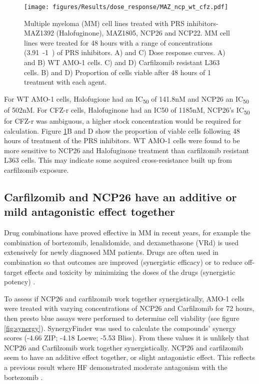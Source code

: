 \begin{figure}[h]
\centering
\texttt{[image: figures/Results/dose\_response/MAZ\_ncp\_wt\_cfz.pdf]}
\caption[PRS inhibitor dose response curves]{Multiple myeloma (MM) cell lines treated with PRS inhibitors- MAZ1392 (Halofuginone), MAZ1805, NCP26 and NCP22.
MM cell lines were treated for 48 hours with a range of concentrations (3.91\si{\nano\Molar}-1\si{\micro\Molar}) of PRS inhibitors.
A) and C) Dose response curves.
A) and B) WT AMO-1 cells.
C) and D) Carfilzomib resistant L363 cells.
B) and D) Proportion of cells viable after 48 hours of 1\si{\micro\Molar} treatment with each agent. }
\label{fig:dose}
\end{figure}

For WT AMO-1 cells, Halofugione had an IC\textsubscript{50} of 141.8nM and NCP26 an IC\textsubscript{50} of 502nM. For CFZ-r cells, Halofuginone had an IC50 of 1185nM, NCP26's IC\textsubscript{50} for CFZ-r was ambiguous, a higher stock concentration would be required for calculation.
Figure \ref{fig:dose}B and D show the proportion of viable cells following 48 hours of treatment of the PRS inhibitors.
WT AMO-1 cells were found to be more sensitive to NCP26 and Halofuginone treatment than carfilzomib resistant L363 cells.
This may indicate some acquired cross-resistance built up from carfilzomib exposure.

\subsection{Carfilzomib and NCP26 have an additive or mild antagonistic effect together}\label{subsec:synergy}
Drug combinations have proved effective in MM in recent years, for example the combination of bortezomib, lenalidomide, and dexamethasone (VRd) is used extensively for newly diagnosed MM patients.
Drugs are often used in combination so that outcomes are improved (synergistic efficacy) or to reduce off-target effects and toxicity by minimizing the doses of the drugs (synergistic potency) \cite{meyer2019quantifying}.

To assess if NCP26 and carfilzomib work together synergistically, AMO-1 cells were treated with varying concentrations of NCP26 and Carfilzomib for 72 hours, then presto blue assays were performed to determine cell viability (see figure \ref{fig:synergy}).
SynergyFinder \cite{zheng2021synergyfinder} was used to calculate the compounds' synergy scores (-4.66 ZIP; -4.18 Loewe; -5.53 Bliss).
From these values it is unlikely that NCP26 and Carfilzomib work together synergistically.
NCP26 and carfilzomib seem to have an additive effect together, or slight antagonistic effect.
This reflects a previous result where HF demonstrated moderate antagonism with the bortezomib \cite{leiba2012halofuginone}.

